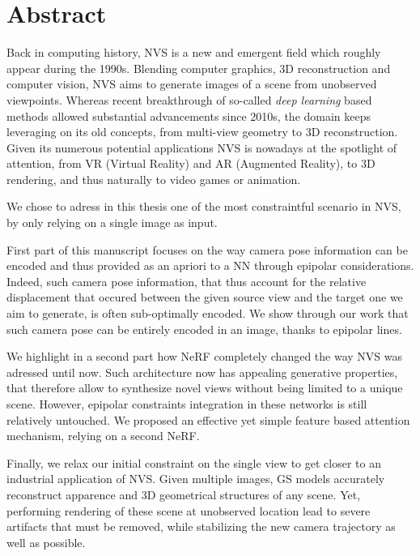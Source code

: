\cleardoublepage
\setcounter{page}{1}

\chapter{Abstract}
Back in computing history, \ac{NVS} is a new and emergent field which roughly appear during the 1990s. Blending computer graphics, 3D reconstruction and computer vision, \ac{NVS} aims to generate images of a scene from unobserved viewpoints. Whereas recent breakthrough of so-called \textit{deep learning} based methods allowed substantial advancements since 2010s, the domain keeps leveraging on its old concepts, from multi-view geometry to 3D reconstruction. Given its numerous potential applications \ac{NVS} is nowadays at the spotlight of attention, from VR (Virtual Reality) and AR (Augmented Reality), to 3D rendering, and thus naturally to video games or animation.

We chose to adress in this thesis one of the most constraintful scenario in \ac{NVS}, by only relying on a single image as input. 

First part of this manuscript focuses on the way camera pose information can be encoded and thus provided as an apriori to a \ac{NN} through epipolar considerations. Indeed, such camera pose information, that thus account for the relative displacement that occured between the given source view and the target one we aim to generate, is often sub-optimally encoded. We show through our work that such camera pose can be entirely encoded in an image, thanks to epipolar lines. 

We highlight in a second part how \ac{NeRF} completely changed the way \ac{NVS} was adressed until now. Such architecture now has appealing generative properties, that therefore allow to synthesize novel views without being limited to a unique scene. However, epipolar constraints integration in these networks is still relatively untouched. We proposed an effective yet simple feature based attention mechanism, relying on a second \ac{NeRF}. 

Finally, we relax our initial constraint on the single view to get closer to an industrial application of \ac{NVS}. Given multiple images, \ac{GS} models accurately reconstruct apparence and 3D geometrical structures of any scene. Yet, performing rendering of these scene at unobserved location lead to severe artifacts that must be removed, while stabilizing the new camera trajectory as well as possible. 

\cleardoublepage


